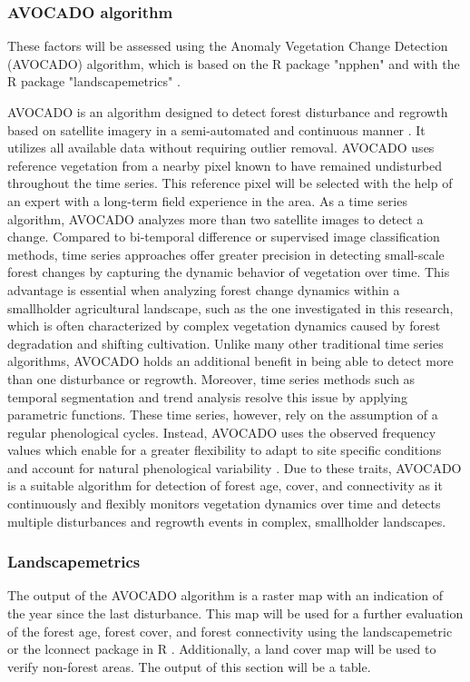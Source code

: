 \subsubsection{AVOCADO algorithm}
These factors will be assessed using the Anomaly Vegetation Change Detection (AVOCADO) algorithm, which is based on the R package "npphen" and with the R package "landscapemetrics" \citep{decuyperContinuousMonitoringForest2022, chavez2017npphen, hesselbarth2019landscapemetrics}. 


AVOCADO is an algorithm designed to detect forest disturbance and regrowth based on satellite imagery in a semi-automated and continuous manner \citep{decuyperContinuousMonitoringForest2022}. It utilizes all available data without requiring outlier removal. AVOCADO uses reference vegetation from a nearby pixel known to have remained undisturbed throughout the time series. This reference pixel will be selected with the help of an expert with a long-term field experience in the area. As a time series algorithm, AVOCADO analyzes more than two satellite images to detect a change. Compared to bi-temporal difference or supervised image classification methods, time series approaches offer greater precision in detecting small-scale forest changes by capturing the dynamic behavior of vegetation over time. This advantage is essential when analyzing forest change dynamics within a smallholder agricultural landscape, such as the one investigated in this research, which is often characterized by complex vegetation dynamics caused by forest degradation and shifting cultivation. Unlike many other traditional time series algorithms, AVOCADO holds an additional benefit in being able to detect more than one disturbance or regrowth. Moreover, time series methods such as temporal segmentation and trend analysis resolve this issue by applying parametric functions. These time series, however, rely on the assumption of a regular phenological cycles. Instead, AVOCADO uses the observed frequency values which enable for a greater flexibility to adapt to site specific conditions and account for natural phenological variability \citep{decuyperContinuousMonitoringForest2022}. Due to these traits, AVOCADO is a suitable algorithm for detection of forest age, cover, and connectivity as it continuously and flexibly monitors vegetation dynamics over time and detects multiple disturbances and regrowth events in complex, smallholder landscapes.

\subsubsection{Landscapemetrics}
The output of the AVOCADO algorithm is a raster map with an indication of the year since the last disturbance. This map will be used for a further evaluation of the forest age, forest cover, and forest connectivity using the landscapemetric or the lconnect package in R \citep{mestreLconnectPackageVersatile2023, hesselbarthLandscapemetricsOpensourceTool2019}. Additionally, a land cover map will be used to verify non-forest areas. The output of this section will be a table.

